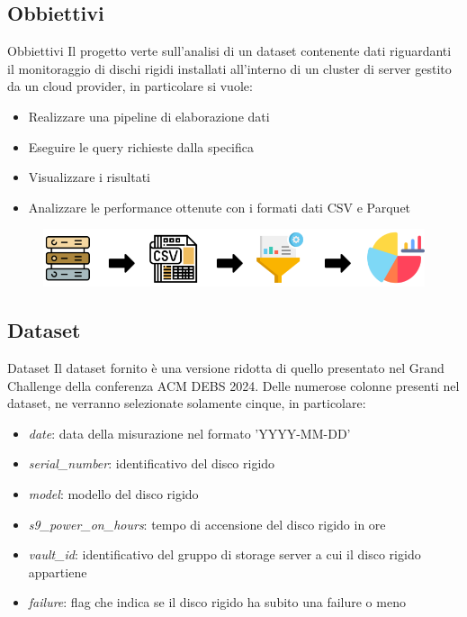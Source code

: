\documentclass[13pt,aspectratio=169,t,xcolor=table]{beamer}
\begin{document}
\subsection{Obbiettivi}
\begin{frame}{Obbiettivi}
    Il progetto verte sull'analisi di un dataset contenente dati riguardanti il monitoraggio di dischi rigidi installati all'interno di un cluster di server gestito da un cloud provider, in particolare si vuole: 
    \vspace{0.3cm}
    \begin{itemize}
        \item Realizzare una pipeline di elaborazione dati
        \item Eseguire le query richieste dalla specifica
        \item Visualizzare i risultati
        \item Analizzare le performance ottenute con i formati dati CSV e Parquet
    \end{itemize}
    \vspace{0.3cm}
    \begin{figure}
        \raggedright
        \hspace{2cm}
        \includegraphics[width=.7\textwidth]{res/intro_icon.png}
    \end{figure}
\end{frame}

\subsection{Dataset}
\begin{frame}{Dataset}
    Il dataset fornito è una versione ridotta di quello presentato nel Grand Challenge della conferenza ACM DEBS 2024. Delle numerose colonne presenti nel dataset, ne verranno selezionate
    solamente cinque, in particolare:
    \begin{itemize}
        \item \textit{date}: data della misurazione nel formato 'YYYY-MM-DD'
        \item \textit{serial\_number}: identificativo del disco rigido
        \item \textit{model}: modello del disco rigido
        \item \textit{s9\_power\_on\_hours}: tempo di accensione del disco rigido in ore
        \item \textit{vault\_id}: identificativo del gruppo di storage server a cui il disco rigido appartiene
        \item \textit{failure}: flag che indica se il disco rigido ha subito una failure o meno
    \end{itemize}
\end{frame}
\end{document}
